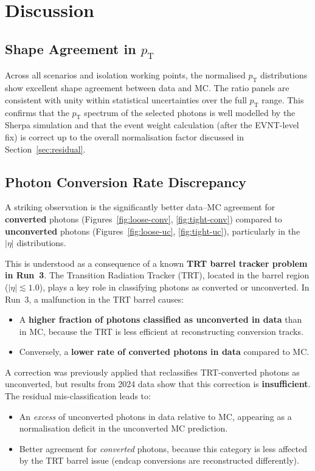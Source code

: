 \documentclass[11pt,a4paper]{article}
\newcommand{\pT}{\ensuremath{p_{\mathrm{T}}}\xspace}
\newcommand{\abseta}{\ensuremath{|\eta|}\xspace}
\begin{document}
\section{Discussion}
\label{sec:discussion}

\subsection{Shape Agreement in $\pT$}

Across all scenarios and isolation working points, the normalised $\pT$
distributions show excellent shape agreement between data and MC.  The ratio
panels are consistent with unity within statistical uncertainties over the
full $\pT$ range.  This confirms that the $\pT$ spectrum of the selected
photons is well modelled by the Sherpa simulation and that the event weight
calculation (after the EVNT-level fix) is correct up to the overall
normalisation factor discussed in Section~\ref{sec:residual}.

\subsection{Photon Conversion Rate Discrepancy}
\label{sec:conversion}

A striking observation is the significantly better data--MC agreement for
\textbf{converted} photons (Figures~\ref{fig:loose-conv},
\ref{fig:tight-conv}) compared to \textbf{unconverted} photons
(Figures~\ref{fig:loose-uc}, \ref{fig:tight-uc}), particularly in the
$\abseta$ distributions.

This is understood as a consequence of a known \textbf{TRT barrel tracker
problem in Run~3}.  The Transition Radiation Tracker (TRT), located in the
barrel region ($|\eta| \lesssim 1.0$), plays a key role in classifying
photons as converted or unconverted.  In Run~3, a malfunction in the TRT
barrel causes:
\begin{itemize}
  \item A \textbf{higher fraction of photons classified as unconverted in
    data} than in MC, because the TRT is less efficient at reconstructing
    conversion tracks.
  \item Conversely, a \textbf{lower rate of converted photons in data} compared
    to MC.
\end{itemize}

A correction was previously applied that reclassifies TRT-converted photons
as unconverted, but results from 2024 data show that this correction is
\textbf{insufficient}.  The residual mis-classification leads to:
\begin{itemize}
  \item An \emph{excess} of unconverted photons in data relative to MC,
    appearing as a normalisation deficit in the unconverted MC prediction.
  \item Better agreement for \emph{converted} photons, because this category
    is less affected by the TRT barrel issue (endcap conversions are
    reconstructed differently).
\end{itemize}
\end{document}
